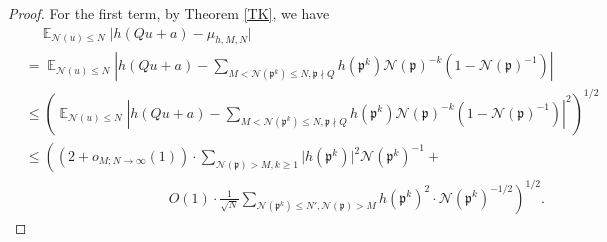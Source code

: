 \documentclass[11pt]{amsart}
\theoremstyle{definition}
\DeclareMathOperator*{\E}{\mathbb{E}}
\newcommand{\NN}{{\mathcal N}}
\newcommand{\Z}{{\mathbb Z}}
\newcommand{\mf}{\mathfrak}
\begin{document}
\begin{proof}
For the first term, by Theorem \ref{TK},
we have 
\begin{equation}\label{20}
    \begin{split}
        &\quad \E_{\NN(u) \leq N}\vert h(Qu+a)-\mu_{h,M,N}\vert 
        \\&=\E_{\NN(u) \leq N}\left| h(Qu+a)-\sum_{M<\NN(\mf p^{k})\leq N, \mf p\nmid Q}h(\mf p^{k})\NN(\mf p)^{-k}(1-\NN(\mf p)^{-1})\right|
        \\&\leq \left(\E_{\NN(u) \leq N}\left| h(Qu+a)-\sum_{M<\NN(\mf p^{k})\leq N,\mf p\nmid Q}h(\mf p^{k})\NN(\mf p)^{-k}(1-\NN(\mf p)^{-1})\right|^{2}\right)^{1/2}
        \\&\leq \left((2+o_{M;N\to\infty}(1))\cdot\sum_{\NN(\mf p)>M, k\geq 1}\vert h(\mf p^{k})\vert^{2}\NN(\mf p^{k})^{-1}+\right. 
        \\&\quad\quad\quad\quad\quad\quad\quad\quad\quad\;\quad \left. O(1)\cdot \frac{1}{\sqrt{N}}\sum_{\NN(\mf p^{k})\leq N', \NN(\mf p)>M}h(\mf p^{k})^{2}\cdot \NN(\mf p^{k})^{-1/2}\right)^{1/2}.
    \end{split}
\end{equation}



 
 

 


\end{proof}
\end{document}
